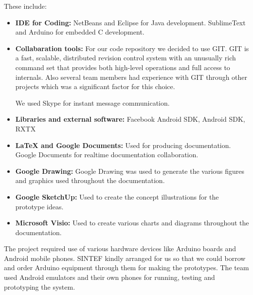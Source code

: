 These include:\newline
\begin{itemize}
	\item \textbf{IDE for Coding:} \newline
	NetBeans and Eclipse for Java development. SublimeText and Arduino for embedded C development.

	\item \textbf{Collabaration tools:} \newline
	For our code repository we decided to use GIT\cite{link:git}. GIT is a fast, scalable, distributed revision control system 
	with an unusually rich command set that provides both high-level operations and full access to internals. Also 
	several team members had experience with GIT through other projects which was a significant factor for 
	this choice.

	We used Skype for instant message communication.

	\item \textbf{Libraries and external software:} \newline
	 Facebook Android SDK, Android SDK, RXTX

	\item \textbf{\LaTeX{} and Google Documents:} \newline
	Used for producing documentation. Google Documents for realtime documentation collaboration.

	\item \textbf{Google Drawing:} \newline
	Google Drawing was used to generate the various figures and graphics used throughout the documentation.

	\item \textbf{Google SketchUp:} \newline
	Used to create the concept illustrations for the prototype ideas.

	\item \textbf{Microsoft Visio:} \newline
	Used to create various charts and diagrams throughout the documentation. 

\end{itemize}

The project required use of various hardware devices like Arduino boards and Android mobile phones.
SINTEF kindly arranged for us so that we could borrow and order Arduino equipment through them for making the prototypes.
The team used Android emulators and their own phones for running, testing and prototyping the system.


